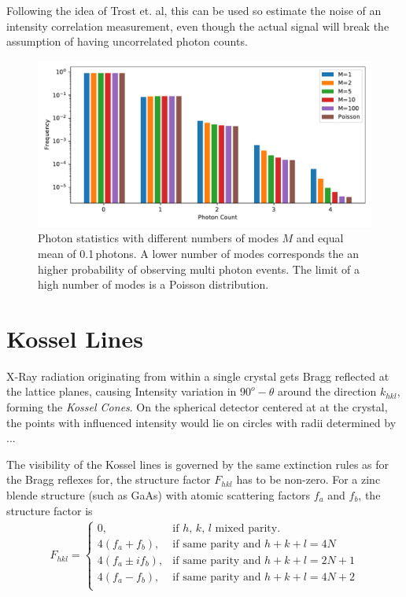Following the idea of Trost et. al, this can be used so estimate the noise of an intensity correlation measurement, even though the actual signal will break the assumption of having uncorrelated photon counts.

\begin{figure}
\centering
\includegraphics[width=0.6\linewidth]{images/modes.pdf}
\caption[Photon Statistics with different numbers of Modes]{Photon statistics with different numbers of modes $M$ and equal mean of 0.1\,photons. A lower number of modes corresponds the an higher probability of observing multi photon events. The limit of a high number of modes is a Poisson distribution.}
\end{figure}
\section{Kossel Lines}
X-Ray radiation originating from within a single crystal gets Bragg reflected at the lattice planes, causing Intensity variation in $90^o-\theta$ around the direction $k_{hkl}$, forming the \textit{Kossel Cones}. On the spherical detector centered at at the crystal, the points with influenced intensity would lie on circles with radii determined by ...

The visibility of the Kossel lines is governed by the same extinction rules as for the Bragg reflexes for, the structure factor $F_{hkl}$ has to be non-zero. For a zinc blende structure (such as GaAs) with atomic scattering factors $f_a$ and $f_b$, the structure factor is
\begin{align}
F_{hkl} = \begin{cases}
0, & \text{if $h$, $k$, $l$ mixed parity}.\\
4(f_a+f_b), & \text{if same parity and $h+k+l = 4 N$} \\
4(f_a\pm i f_b), & \text{if same parity and $h+k+l = 2 N+1$} \\
4(f_a-f_b), & \text{if same parity and $h+k+l = 4 N+2$} \\
\end{cases}
\end{align}

